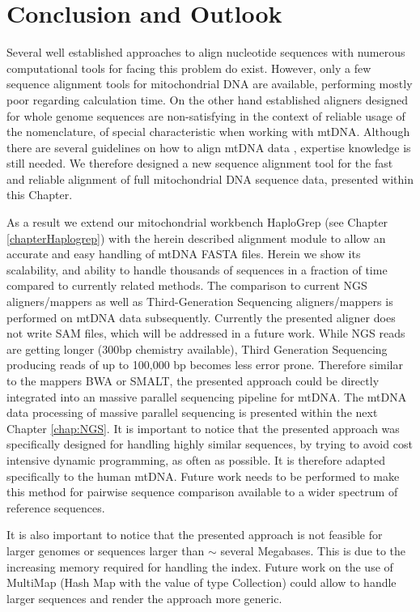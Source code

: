 \section{Conclusion and Outlook}
Several well established approaches to align nucleotide sequences with numerous computational tools for facing this problem do exist. However, only a few sequence alignment tools for mitochondrial DNA are available, performing mostly poor regarding calculation time. On the other hand established aligners designed for whole genome sequences are non-satisfying in the context of reliable usage of the nomenclature, of special characteristic when working with mtDNA. Although there are several guidelines on how to align mtDNA data \cite{Wilson2002,Bandelt2008,Polanskey2010}, expertise knowledge is still needed. We therefore designed a new sequence alignment tool for the fast and reliable alignment of full mitochondrial DNA sequence data, presented within this Chapter. 

As a result we extend our mitochondrial workbench HaploGrep (see Chapter \ref{chapterHaplogrep}) with the herein described alignment module to allow an accurate and easy handling of mtDNA FASTA files. Herein we show its scalability, and ability to handle thousands of sequences in a fraction of time compared to currently related methods. The comparison to current NGS aligners/mappers as well as Third-Generation Sequencing aligners/mappers is performed on mtDNA data subsequently. Currently the presented aligner does not write SAM files, which will be addressed in a future work. While NGS reads are getting longer (300bp chemistry available), Third Generation Sequencing producing reads of up to 100,000 bp becomes less error prone. Therefore similar to the mappers BWA or SMALT, the presented approach could be directly integrated into an massive parallel sequencing pipeline for mtDNA. 
The mtDNA data processing of massive parallel sequencing is presented within the next Chapter \ref{chap:NGS}. It is important to notice that the presented approach was specifically designed for handling highly similar sequences, by trying to avoid cost intensive dynamic programming, as often as possible. It is therefore adapted specifically to the human mtDNA. Future work needs to be performed to make this method for pairwise sequence comparison available to a wider spectrum of reference sequences. 

It is also important to notice that the presented approach is not feasible for larger genomes or sequences larger than $\sim$ several Megabases. This is due to the increasing memory required for handling the index. Future work on the use of MultiMap (Hash Map with the value of type Collection) could allow to handle larger sequences and render the approach more generic. 




